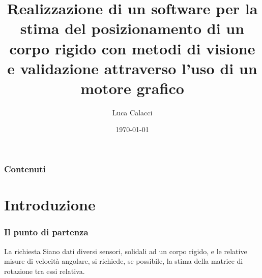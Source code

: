 \documentclass{beamer}
\title[Visual Observer]{Realizzazione di un software per la stima del posizionamento di un corpo rigido con metodi di visione e validazione attraverso l'uso di un motore grafico} %
\author{Luca Calacci} %
\institute[Università Tor Vergata] %
{
Università degli Studi di Roma - Tor Vergata \\ %
\medskip
\textit{luca.calacci@gmail.com} %
}
\date{\today} %
\begin{document}
\begin{frame}
\titlepage %
\end{frame}

\begin{frame}
\frametitle{Contenuti} %
\tableofcontents %
\end{frame}


\section{Introduzione} %

\begin{frame}
\frametitle{Il punto di partenza}
\begin{block}{La richiesta}
	Siano dati diversi sensori, solidali ad un corpo rigido, e le relative misure di velocità angolare, si richiede, se possibile, la stima della matrice di rotazione tra essi relativa. 
\end{block}
\end{frame}
\end{document}
